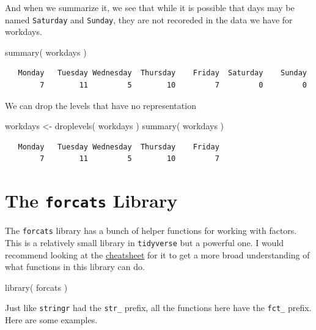 \documentclass[
  letterpaper,
]{book}
\newenvironment{Shaded}{\begin{snugshade}}{\end{snugshade}}
\newcommand{\FunctionTok}[1]{\textcolor[rgb]{0.28,0.35,0.67}{#1}}
\newcommand{\NormalTok}[1]{\textcolor[rgb]{0.00,0.23,0.31}{#1}}
\newcommand{\OtherTok}[1]{\textcolor[rgb]{0.00,0.23,0.31}{#1}}
\begin{document}
And when we summarize it, we see that while it is possible that days may
be named \texttt{Saturday} and \texttt{Sunday}, they are not recoreded
in the data we have for workdays.

\begin{Shaded}
\begin{Highlighting}[]
\FunctionTok{summary}\NormalTok{( workdays )}
\end{Highlighting}
\end{Shaded}

\begin{verbatim}
   Monday   Tuesday Wednesday  Thursday    Friday  Saturday    Sunday 
        7        11         5        10         7         0         0 
\end{verbatim}

We can drop the levels that have no representation

\begin{Shaded}
\begin{Highlighting}[]
\NormalTok{workdays }\OtherTok{\textless{}{-}} \FunctionTok{droplevels}\NormalTok{( workdays ) }
\FunctionTok{summary}\NormalTok{( workdays )}
\end{Highlighting}
\end{Shaded}

\begin{verbatim}
   Monday   Tuesday Wednesday  Thursday    Friday 
        7        11         5        10         7 
\end{verbatim}

\section{\texorpdfstring{The \texttt{forcats}
Library}{The forcats Library}}\label{the-forcats-library}

The \texttt{forcats} library has a bunch of helper functions for working
with factors. This is a relatively small library in \texttt{tidyverse}
but a powerful one. I would recommend looking at the \href{}{cheatsheet}
for it to get a more broad understanding of what functions in this
library can do.

\begin{Shaded}
\begin{Highlighting}[]
\FunctionTok{library}\NormalTok{( forcats )}
\end{Highlighting}
\end{Shaded}

Just like \texttt{stringr} had the \texttt{str\_} prefix, all the
functions here have the \texttt{fct\_} prefix. Here are some examples.
\end{document}
